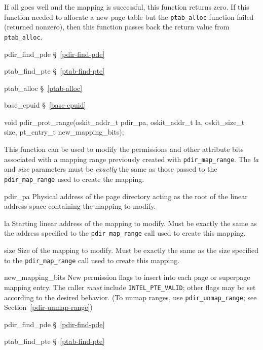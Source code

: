 \begin{apiret}
	If all goes well and the mapping is successful,
	this function returns zero.
	If this function needed to allocate a new page table
	but the {\tt ptab_alloc} function failed (returned nonzero),
	then this function passes back the return value from {\tt ptab_alloc}.
\end{apiret}
\begin{apidep}
	\item[pdir_find_pde]	\S~\ref{pdir-find-pde}
	\item[ptab_find_pte]	\S~\ref{ptab-find-pte}
	\item[ptab_alloc]	\S~\ref{ptab-alloc}
	\item[base_cpuid]	\S~\ref{base-cpuid}
\end{apidep}

\label{pdir-prot-range}
\begin{apisyn}

	\funcproto void pdir_prot_range(oskit_addr_t pdir_pa, oskit_addr_t la,
					oskit_size_t size,
					pt_entry_t new_mapping_bits);
\end{apisyn}
\begin{apidesc}
	This function can be used
	to modify the permissions and other attribute bits
	associated with a mapping range
	previously created with {\tt pdir_map_range}.
	The \emph{la} and \emph{size} parameters
	must be \emph{exactly} the same as those passed
	to the {\tt pdir_map_range} used to create the mapping.
\end{apidesc}
\begin{apiparm}
	\item[pdir_pa]
		Physical address of the page directory
		acting as the root of the linear address space
		containing the mapping to modify.
	\item[la]
		Starting linear address of the mapping to modify.
		Must be exactly the same as the address
		specified to the {\tt pdir_map_range} call
		used to create this mapping.
	\item[size]
		Size of the mapping to modify.
		Must be exactly the same as the size
		specified to the {\tt pdir_map_range} call
		used to create this mapping.
	\item[new_mapping_bits]
		New permission flags to insert
		into each page or superpage mapping entry.
		The caller \emph{must} include {\tt INTEL_PTE_VALID};
		other flags may be set according to the desired behavior.
		(To unmap ranges, use {\tt pdir_unmap_range};
		see Section~\ref{pdir-unmap-range})
\end{apiparm}
\begin{apidep}
	\item[pdir_find_pde]	\S~\ref{pdir-find-pde}
	\item[ptab_find_pte]	\S~\ref{ptab-find-pte}
\end{apidep}


